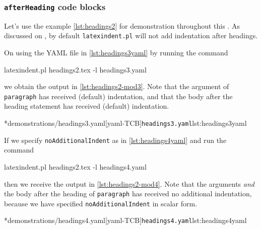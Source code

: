 \subsubsection{\texttt{afterHeading} code blocks}\label{subsubsec-headings-no-add-indent-rules}
	Let's use the example \cref{lst:headings2} for demonstration throughout this .
	As discussed on , by default \texttt{latexindent.pl} will not add indentation after headings.


	On using the YAML file in \cref{lst:headings3yaml} by running the command
	\begin{commandshell}
latexindent.pl headings2.tex -l headings3.yaml      
    \end{commandshell}
	we obtain the output in \cref{lst:headings2-mod3}. Note that the argument of \texttt{paragraph} has received (default) indentation,
	and that the body after the heading statement has received (default) indentation.

	\begin{minipage}{.45\textwidth}
	\end{minipage}%
	\hfill
	\begin{minipage}{.45\textwidth}
		\cmhlistingsfromfile[style=yaml-LST]*{demonstrations/headings3.yaml}[yaml-TCB]{\texttt{headings3.yaml}}{lst:headings3yaml}
	\end{minipage}

	If we specify \texttt{noAdditionalIndent} as in \cref{lst:headings4yaml} and run the command
	\begin{commandshell}
latexindent.pl headings2.tex -l headings4.yaml      
    \end{commandshell}
	then we receive the output in \cref{lst:headings2-mod4}. Note that the arguments \emph{and} the body after the heading
	of \texttt{paragraph} has received no additional indentation, because we have specified \texttt{noAdditionalIndent} in scalar form.

	\begin{minipage}{.45\textwidth}
	\end{minipage}%
	\hfill
	\begin{minipage}{.45\textwidth}
		\cmhlistingsfromfile[style=yaml-LST]*{demonstrations/headings4.yaml}[yaml-TCB]{\texttt{headings4.yaml}}{lst:headings4yaml}
	\end{minipage}

